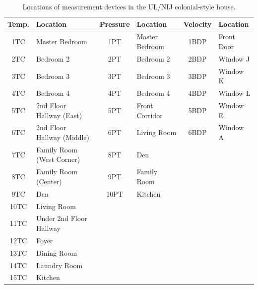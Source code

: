 \begin{table}[ht!]
\begin{center}
\begin{tabular}{|c|l||c|l||c|l|}
\hline
Temp.           	& Location 					& Pressure          	& Location 			& Velocity              & Location 		\\ \hline \hline
1TC  				& Master Bedroom 			& 1PT 					& Master Bedroom 	& 1BDP 					& Front Door 	\\ \hline
2TC  				& Bedroom 2 				& 2PT 					& Bedroom 2 		& 2BDP 					& Window J 		\\ \hline
3TC  				& Bedroom 3 				& 3PT 					& Bedroom 3 		& 3BDP 					& Window K 		\\ \hline
4TC  				& Bedroom 4 				& 4PT 					& Bedroom 4 		& 4BDP 					& Window L 		\\ \hline
5TC  				& 2nd Floor Hallway (East) 	& 5PT 					& Front Corridor 	& 5BDP 					& Window E 		\\ \hline
6TC  				& 2nd Floor Hallway (Middle)& 6PT 					& Living Room 		& 6BDP 					& Window A 		\\ \hline
7TC  				& Family Room (West Corner)	& 8PT 					& Den 				& \multicolumn{2}{r|}{}  				\\ \cline{1-4}
8TC  				& Family Room (Center) 		& 9PT 					& Family Room 		& \multicolumn{2}{r|}{}  				\\ \cline{1-4}
9TC  				& Den 						& 10PT 					& Kitchen 			& \multicolumn{2}{r|}{} 				\\ \cline{1-4}
10TC 				& Living Room 				& \multicolumn{4}{r|}{}											 					\\ \cline{1-2}
11TC  				& Under 2nd Floor Hallway 	& \multicolumn{4}{r|}{} 															\\ \cline{1-2}
12TC  				& Foyer 					& \multicolumn{4}{r|}{} 											 				\\ \cline{1-2}
13TC  				& Dining Room 				& \multicolumn{4}{r|}{} 											 				\\ \cline{1-2}
14TC  				& Laundry Room 				& \multicolumn{4}{r|}{} 											 				\\ \cline{1-2}
15TC  				& Kitchen 					& \multicolumn{4}{r|}{} 											 				\\ \hline
\end{tabular}
\end{center}
\caption[Locations of measurement devices in the UL/NIJ colonial-style house]
{Locations of measurement devices in the UL/NIJ colonial-style house.}
\label{Colonial_devices}
\end{table}

